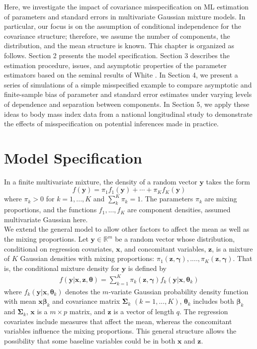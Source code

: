 \documentclass[10pt]{article}
\newcommand{\B}[0]{\mathbf}
\newcommand{\bs}[0]{\boldsymbol}
\begin{document}
Here, we investigate the impact of covariance misspecification on ML estimation of parameters and standard errors in multivariate Gaussian mixture models. In particular, our focus is on the assumption of conditional independence for the covariance structure; therefore, we assume the number of components, the distribution, and the mean structure is known. This chapter is organized as follows. Section 2 presents the model specification. Section 3 describes the estimation procedure, issues, and asymptotic properties of the parameter estimators based on the seminal results of White \cite{white1982}.  In Section 4, we present a series of simulations of a simple misspecified example to compare asymptotic and finite-sample bias of parameter and standard error estimates under varying levels of dependence and separation between components. In Section 5, we apply these ideas to body mass index data from a national longitudinal study to demonstrate the effects of misspecification on potential inferences made in practice. 
\section{Model Specification}
In a finite multivariate mixture, the density of a random vector $\B y$ takes the form
$$f(\B y)=\pi_{1}f_{1}(\B y)+\cdots+\pi_{K}f_{K}(\B y)$$
where $\pi_{k}>0$ for $k=1,...,K$ and $\sum^{K}_{k}\pi_{k}=1$. The parameters $\pi_{k}$ are mixing proportions, and the functions $f_{1},...,f_{K}$ are component densities, assumed multivariate Gaussian here. \\

We extend the general model to allow other factors to affect the mean as well as the mixing proportions. Let $\B y\in\mathbb{R}^{m}$ be a random vector whose distribution, conditional on regression covariates, $\B x$, and concomitant variables, $\B z$, is a mixture of $K$ Gaussian densities with mixing proportions: $\pi_{1}(\B z,\bs \gamma),....,\pi_{K}(\B z,\bs \gamma)$. That is, the conditional mixture density for $\B y$ is defined by
\begin{align}
f(\B y|\B x,\B z,\bs \theta)=\sum^{K}_{k=1}\pi_{k}(\B z,\bs\gamma)f_{k}(\B y|\B x,\bs\theta_{k}) \label{mixdens}
\end{align}
where $f_{k}(\B y|\B x,\bs\theta_{k})$ denotes the $m$-variate Gaussian probability density function with mean $\B x\bs \beta_{k}$ and covariance matrix $\bs\Sigma_{k}$ $(k=1,...,K)$, $\bs\theta_{k}$ includes both $\bs\beta_{k}$ and $\bs\Sigma_{k}$, $\B x$ is a $m\times p$ matrix, and $\B z$ is a vector of length $q$. The regression covariates include measures that affect the mean, whereas the concomitant variables influence the mixing proportions. This general structure allows the possibility that some baseline variables could be in both $\B x$ and $\B z$. \\
\end{document}

